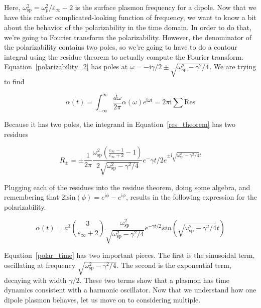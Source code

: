 \documentclass [11pt, proquest] {uwthesis}[2016/11/22]
\begin{document}
Here, $\omega_{\textrm{sp}}^2 = \omega_p^2/\varepsilon_{\infty}+2$ is the surface plasmon frequency for a dipole. Now that we have this rather complicated-looking function of frequency, we want to know a bit about the behavior of the polarizability in the time domain. In order to do that, we're going to Fourier transform the polarizability. However, the denominator of the polarizability contains two poles, so we're going to have to do a contour integral using the residue theorem to actually compute the Fourier transform. Equation~\ref{polarizability_2} has poles at $\omega = -\textrm{i}\gamma/2 \pm \sqrt{\omega_\textrm{sp}^2-\gamma^2/4}$. We are trying to find

\begin{equation}
\alpha(t) = \int_{-\infty}^{\infty}\frac{d\omega}{2\pi}\alpha(\omega)e^{\textrm{i}\omega t} = 2\pi\textrm{i}\sum\textrm{Res}
\label{res_theorem}
\end{equation}

Because it has two poles, the integrand in Equation~\ref{res_theorem} has two residues

\begin{equation}
R_{\pm} = \pm\frac{1}{2\pi}\frac{\omega_{\textrm{sp}}^2\left(\frac{\varepsilon_{\infty}-1}{\varepsilon_{\infty}+2}-1\right)}{2\sqrt{\omega_\textrm{sp}^2-\gamma^2/4}}e^-{\gamma t/2}e^{\pm\textrm{i}\sqrt{\omega_\textrm{sp}^2-\gamma^2/4}t}
\label{residues}
\end{equation}

Plugging each of the residues into the residue theorem, doing some algebra, and remembering that $ 2\textrm{i}\textrm{sin}(\phi) = e^{\textrm{i}\phi} - e^{\textrm{i}\phi} $, results in the following expression for the polarizability.

\begin{equation}
\alpha(t) = a^3\left(\frac{3}{\varepsilon_{\infty}+2}\right)\frac{\omega_{\textrm{sp}}^2}{\sqrt{\omega_\textrm{sp}^2-\gamma^2/4}}e^{-\gamma t/2}sin(\sqrt{\omega_\textrm{sp}^2-\gamma^2/4}t)
\label{polar_time}
\end{equation}

Equation~\ref{polar_time} has two important pieces. The first is the sinusoidal term, oscillating at frequency $\sqrt{\omega_\textrm{sp}^2-\gamma^2/4}$. The second is the exponential term, decaying with width $\gamma/2$. These two terms show that a plasmon has time dynamics consistent with a harmonic oscillator. Now that we understand how one dipole plasmon behaves, let us move on to considering multiple.
\end{document}
